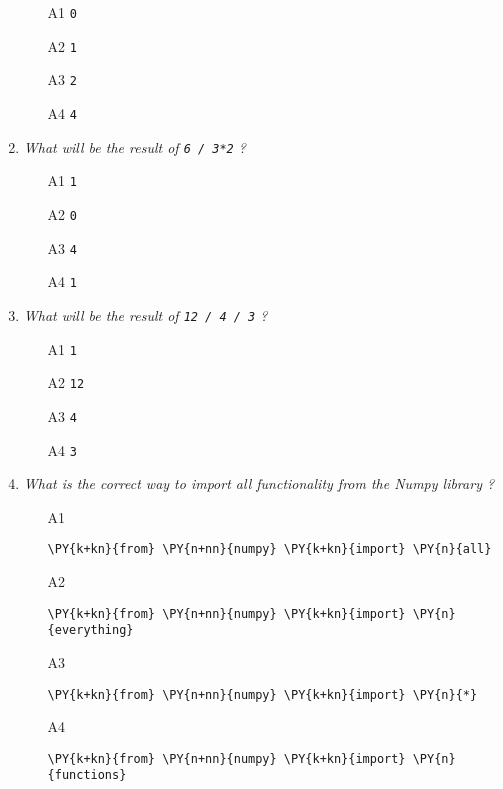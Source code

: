 \begin{enumerate}
\begin{enumerate}
\item[A1] {\tt 0}
\item[A2] {\tt 1}
\item[A3] {\tt 2}
\item[A4] {\tt 4}
\end{enumerate}

\vspace{6mm}

\item {\em What will be the result of {\tt 6 / 3*2} ?}\\

\begin{enumerate}
\item[A1] {\tt 1}
\item[A2] {\tt 0}
\item[A3] {\tt 4}
\item[A4] {\tt 1}
\end{enumerate}

\vspace{6mm}

\item {\em What will be the result of {\tt 12 / 4 / 3} ?}\\

\begin{enumerate}
\item[A1] {\tt 1}
\item[A2] {\tt 12}
\item[A3] {\tt 4}
\item[A4] {\tt 3}
\end{enumerate}

\vspace{6mm}

\item {\em What is the correct way to import all functionality from the Numpy library ?}\\

\begin{enumerate}
\item[A1] 
\begin{Verbatim}[commandchars=\\\{\}]
\PY{k+kn}{from} \PY{n+nn}{numpy} \PY{k+kn}{import} \PY{n}{all}
\end{Verbatim}
\item[A2] 
\begin{Verbatim}[commandchars=\\\{\}]
\PY{k+kn}{from} \PY{n+nn}{numpy} \PY{k+kn}{import} \PY{n}{everything}
\end{Verbatim}
\item[A3]
\begin{Verbatim}[commandchars=\\\{\}]
\PY{k+kn}{from} \PY{n+nn}{numpy} \PY{k+kn}{import} \PY{n}{*}
\end{Verbatim}
\item[A4] 
\begin{Verbatim}[commandchars=\\\{\}]
\PY{k+kn}{from} \PY{n+nn}{numpy} \PY{k+kn}{import} \PY{n}{functions}
\end{Verbatim}
\end{enumerate}


\end{enumerate}
